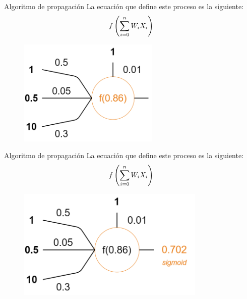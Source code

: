 \begin{frame}{Algoritmo de propagación}
La ecuación que define este \alert{proceso} es la siguiente:
\setcounter{equation}{0}
\begin{equation}
    \Large f\left(\sum_{i=0}^{n} W_{i} X_{i}\right)
\end{equation}

\begin{figure}
\centering
    \includegraphics[width=0.6\textwidth]{Slides/figures/Tema 3/PropagationExample_4.png}
\end{figure}
\end{frame}

\begin{frame}{Algoritmo de propagación}
La ecuación que define este \alert{proceso} es la siguiente:
\setcounter{equation}{0}
\begin{equation}
    \Large f\left(\sum_{i=0}^{n} W_{i} X_{i}\right)
\end{equation}

\begin{figure}
\centering
    \includegraphics[width=0.8\textwidth]{Slides/figures/Tema 3/PropagationExample_5.png}
\end{figure}
\end{frame}

